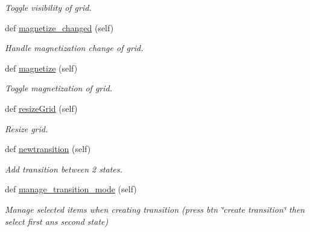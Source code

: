 \begin{DoxyCompactItemize}
\begin{DoxyCompactList}\small\item\em Toggle visibility of grid. \end{DoxyCompactList}\item 
\mbox{\label{classInterface_1_1Window_a5bcf83fa71fc77a06ae5095bac781a2c}} 
def \mbox{\hyperlink{classInterface_1_1Window_a5bcf83fa71fc77a06ae5095bac781a2c}{magnetize\+\_\+changed}} (self)
\begin{DoxyCompactList}\small\item\em Handle magnetization change of grid. \end{DoxyCompactList}\item 
\mbox{\label{classInterface_1_1Window_a37844a18bd7bd73302c71c60979dadae}} 
def \mbox{\hyperlink{classInterface_1_1Window_a37844a18bd7bd73302c71c60979dadae}{magnetize}} (self)
\begin{DoxyCompactList}\small\item\em Toggle magnetization of grid. \end{DoxyCompactList}\item 
\mbox{\label{classInterface_1_1Window_adb0b6e2198b65a0d46904dd4218f3f3e}} 
def \mbox{\hyperlink{classInterface_1_1Window_adb0b6e2198b65a0d46904dd4218f3f3e}{resize\+Grid}} (self)
\begin{DoxyCompactList}\small\item\em Resize grid. \end{DoxyCompactList}\item 
\mbox{\label{classInterface_1_1Window_aa88754f866649f465452d362404dcf19}} 
def \mbox{\hyperlink{classInterface_1_1Window_aa88754f866649f465452d362404dcf19}{newtransition}} (self)
\begin{DoxyCompactList}\small\item\em Add transition between 2 states. \end{DoxyCompactList}\item 
\mbox{\label{classInterface_1_1Window_a34dfa80e3805f4047364508572c2c472}} 
def \mbox{\hyperlink{classInterface_1_1Window_a34dfa80e3805f4047364508572c2c472}{manage\+\_\+transition\+\_\+mode}} (self)
\begin{DoxyCompactList}\small\item\em Manage selected items when creating transition (press btn \char`\"{}create transition\char`\"{} then select first ans second state) \end{DoxyCompactList}\item 

\end{DoxyCompactItemize}
